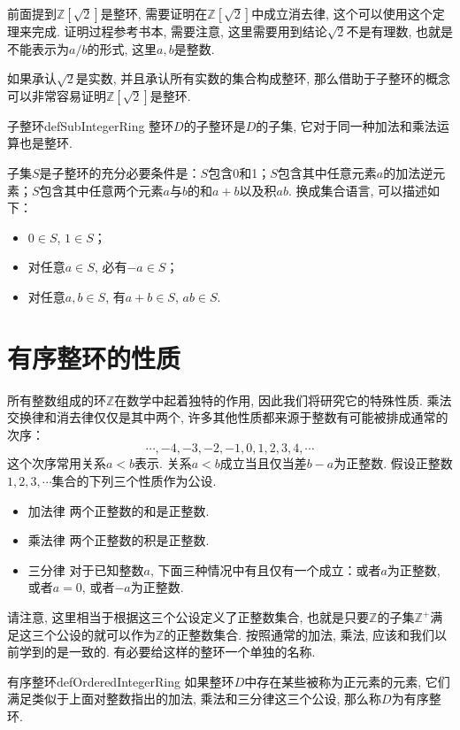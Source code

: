 前面提到$\mathbb{Z}[\sqrt{2}]$是整环, 需要证明在$\mathbb{Z}[\sqrt{2}]$中成立消去律, 这个可以使用这个定理来完成. 证明过程参考书本, 需要注意, 这里需要用到结论$\sqrt{2}$不是有理数, 也就是不能表示为$a/b$的形式, 这里$a, b$是整数. 

如果承认$\sqrt{2}$是实数, 并且承认所有实数的集合构成整环, 那么借助于子整环的概念可以非常容易证明$\mathbb{Z}[\sqrt{2}]$是整环. 
\begin{definition}{子整环}{defSubIntegerRing}
整环$D$的子整环是$D$的子集, 它对于同一种加法和乘法运算也是整环. 
\end{definition}

子集$S$是子整环的充分必要条件是：$S$包含0和1；$S$包含其中任意元素$a$的加法逆元素；$S$包含其中任意两个元素$a$与$b$的和$a+b$以及积$ab$. 换成集合语言, 可以描述如下：
\begin{itemize}
\item $0 \in S$, $1 \in S$；
\item 对任意$a \in S$, 必有$-a \in S$；
\item 对任意$a, b \in S$, 有$a + b \in S$, $ab \in S$. 
\end{itemize}


\section{有序整环的性质}\label{subsection00103}
所有整数组成的环$\mathbb{Z}$在数学中起着独特的作用, 因此我们将研究它的特殊性质. 乘法交换律和消去律仅仅是其中两个, 许多其他性质都来源于整数有可能被排成通常的次序：
\[
\cdots,-4,-3,-2,-1,0,1,2,3,4,\cdots
\]
这个次序常用关系$a<b$表示. 关系$a<b$成立当且仅当差$b-a$为正整数. 假设正整数$1,2,3,\cdots$集合的下列三个性质作为公设. 
\begin{itemize}
\item 加法律 两个正整数的和是正整数. 
\item 乘法律 两个正整数的积是正整数. 
\item 三分律 对于已知整数$a$, 下面三种情况中有且仅有一个成立：或者$a$为正整数, 或者$a=0$, 或者$-a$为正整数. 
\end{itemize}

请注意, 这里相当于根据这三个公设定义了正整数集合, 也就是只要$\mathbb{Z}$的子集$\mathbb{Z}^+$满足这三个公设的就可以作为$\mathbb{Z}$的正整数集合. 按照通常的加法, 乘法, 应该和我们以前学到的是一致的. 有必要给这样的整环一个单独的名称. 

\begin{definition}{有序整环}{defOrderedIntegerRing}
如果整环$D$中存在某些被称为正元素的元素, 它们满足类似于上面对整数指出的加法, 乘法和三分律这三个公设, 那么称$D$为有序整环. 
\end{definition}

